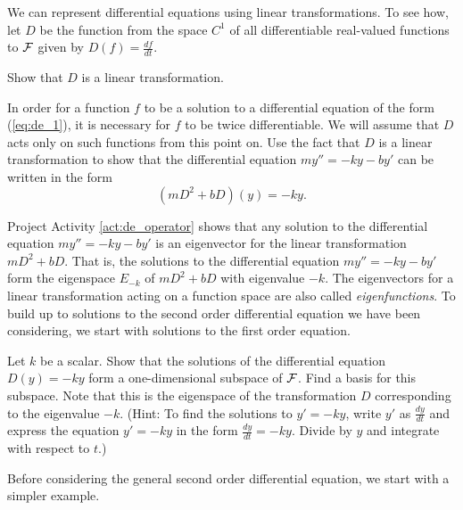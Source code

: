 \begin{pactivity} \label{act:de_operator} We can represent differential equations using linear transformations. To see how, let $D$ be the function from the space $C^1$ of all differentiable real-valued functions to $\mathcal{F}$ given by $D(f)  = \frac{df}{dt}$. 

\ba
\item Show that $D$ is a linear transformation. 

\item In order for a function $f$ to be a solution to a differential equation of the form (\ref{eq:de_1}), it is necessary for $f$ to be twice differentiable. We will assume that $D$ acts only on such functions from this point on. Use the fact that $D$ is a linear transformation to show that the differential equation $my'' = -ky-by'$ can be written in the form 
\[\left(mD^2 + bD \right)(y) = -ky.\]

\ea

\end{pactivity}

Project Activity \ref{act:de_operator} shows that any solution to the differential equation $my'' = -ky-by'$ is an eigenvector for the linear transformation $mD^2 + bD$. That is, the solutions to the differential equation $my'' = -ky-by'$ form the eigenspace $E_{-k}$ of $mD^2 + bD$ with eigenvalue $-k$. The eigenvectors for a linear transformation acting on a function space are also called  \emph{eigenfunctions}. To build up to solutions to the second order differential equation we have been considering, we start with solutions to the first order equation.

\begin{pactivity} \label{act:de_first_order} Let $k$ be a scalar. Show that the solutions of the differential equation $D(y) = -ky$ form a one-dimensional subspace of $\mathcal{F}$. Find a basis for this subspace. Note that this is the eigenspace of the transformation $D$ corresponding to the eigenvalue $-k$. (Hint: To find the solutions to $y' = -ky$, write $y'$ as $\frac{dy}{dt}$ and express the equation $y' = -ky$ in the form $\frac{dy}{dt} = -ky$. Divide by $y$ and integrate with respect to $t$.)

\end{pactivity}

Before considering the general second order differential equation, we start with a simpler example. 

